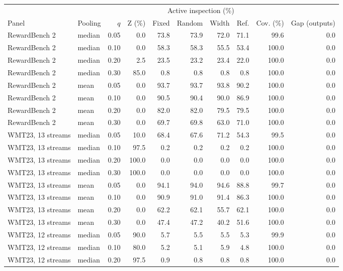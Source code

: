 \begin{table}[t]
\centering\small
\begin{tabular}{llrrrrrrrr}
\toprule
 & & & & \multicolumn{4}{c}{Active inspection (\%)} & & \\
Panel & Pooling & $q$ & Z (\%) & Fixed & Random & Width & Ref. & Cov. (\%) & Gap (outputs) \\
\midrule
RewardBench 2 & median & 0.05 & 0.0 & 73.8 & 73.9 & 72.0 & 71.1 & 99.6 & 0.0 \\
RewardBench 2 & median & 0.10 & 0.0 & 58.3 & 58.3 & 55.5 & 53.4 & 100.0 & 0.0 \\
RewardBench 2 & median & 0.20 & 2.5 & 23.5 & 23.2 & 23.4 & 22.0 & 100.0 & 0.0 \\
RewardBench 2 & median & 0.30 & 85.0 & 0.8 & 0.8 & 0.8 & 0.8 & 100.0 & 0.0 \\
RewardBench 2 & mean & 0.05 & 0.0 & 93.7 & 93.7 & 93.8 & 90.2 & 100.0 & 0.0 \\
RewardBench 2 & mean & 0.10 & 0.0 & 90.5 & 90.4 & 90.0 & 86.9 & 100.0 & 0.0 \\
RewardBench 2 & mean & 0.20 & 0.0 & 82.0 & 82.0 & 79.5 & 79.5 & 100.0 & 0.0 \\
RewardBench 2 & mean & 0.30 & 0.0 & 69.7 & 69.8 & 63.0 & 71.0 & 100.0 & 0.0 \\
WMT23, 13 streams & median & 0.05 & 10.0 & 68.4 & 67.6 & 71.2 & 54.3 & 99.5 & 0.0 \\
WMT23, 13 streams & median & 0.10 & 97.5 & 0.2 & 0.2 & 0.2 & 0.2 & 100.0 & 0.0 \\
WMT23, 13 streams & median & 0.20 & 100.0 & 0.0 & 0.0 & 0.0 & 0.0 & 100.0 & 0.0 \\
WMT23, 13 streams & median & 0.30 & 100.0 & 0.0 & 0.0 & 0.0 & 0.0 & 100.0 & 0.0 \\
WMT23, 13 streams & mean & 0.05 & 0.0 & 94.1 & 94.0 & 94.6 & 88.8 & 99.7 & 0.0 \\
WMT23, 13 streams & mean & 0.10 & 0.0 & 90.9 & 91.0 & 91.4 & 86.3 & 100.0 & 0.0 \\
WMT23, 13 streams & mean & 0.20 & 0.0 & 62.2 & 62.1 & 55.7 & 62.1 & 100.0 & 0.0 \\
WMT23, 13 streams & mean & 0.30 & 0.0 & 47.4 & 47.2 & 40.2 & 51.6 & 100.0 & 0.0 \\
WMT23, 12 streams & median & 0.05 & 90.0 & 5.7 & 5.5 & 5.5 & 5.3 & 99.9 & 0.0 \\
WMT23, 12 streams & median & 0.10 & 80.0 & 5.2 & 5.1 & 5.9 & 4.8 & 100.0 & 0.0 \\
WMT23, 12 streams & median & 0.20 & 97.5 & 0.9 & 0.8 & 0.8 & 0.8 & 100.0 & 0.0 \\

\end{tabular}
\end{table}

